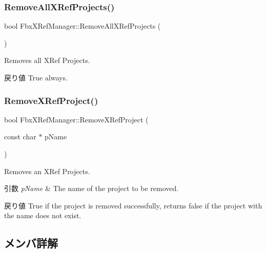 \subsubsection{\texorpdfstring{Remove\+All\+X\+Ref\+Projects()}{RemoveAllXRefProjects()}}
{\footnotesize\ttfamily bool Fbx\+X\+Ref\+Manager\+::\+Remove\+All\+X\+Ref\+Projects (\begin{DoxyParamCaption}{ }\end{DoxyParamCaption})}

Removes all X\+Ref Projects. \begin{DoxyReturn}{戻り値}
{\ttfamily True} always. 
\end{DoxyReturn}
\mbox{\label{class_fbx_x_ref_manager_a910538a083181d0552e00f6a852ac8e4}} 
\subsubsection{\texorpdfstring{Remove\+X\+Ref\+Project()}{RemoveXRefProject()}}
{\footnotesize\ttfamily bool Fbx\+X\+Ref\+Manager\+::\+Remove\+X\+Ref\+Project (\begin{DoxyParamCaption}\item[{const char $\ast$}]{p\+Name }\end{DoxyParamCaption})}

Removes an X\+Ref Projects. 
\begin{DoxyParams}{引数}
{\em p\+Name} & The name of the project to be removed. \\
\hline
\end{DoxyParams}
\begin{DoxyReturn}{戻り値}
{\ttfamily True} if the project is removed successfully, returns {\ttfamily false} if the project with the name does not exist. 
\end{DoxyReturn}


\subsection{メンバ詳解}
\mbox{\label{class_fbx_x_ref_manager_a2b587f862e487323d69830ecb3c148a3}} 
